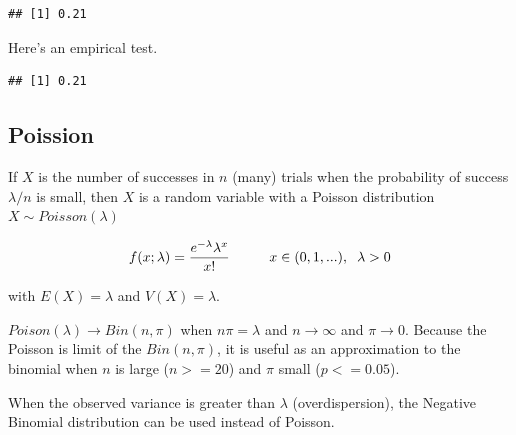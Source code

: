 \documentclass[
]{book}
\newenvironment{Shaded}{\begin{snugshade}}{\end{snugshade}}
\newcommand{\DataTypeTok}[1]{\textcolor[rgb]{0.13,0.29,0.53}{#1}}
\newcommand{\DecValTok}[1]{\textcolor[rgb]{0.00,0.00,0.81}{#1}}
\newcommand{\FloatTok}[1]{\textcolor[rgb]{0.00,0.00,0.81}{#1}}
\newcommand{\KeywordTok}[1]{\textcolor[rgb]{0.13,0.29,0.53}{\textbf{#1}}}
\newcommand{\NormalTok}[1]{#1}
\newcommand{\OperatorTok}[1]{\textcolor[rgb]{0.81,0.36,0.00}{\textbf{#1}}}
\newcommand{\StringTok}[1]{\textcolor[rgb]{0.31,0.60,0.02}{#1}}
\begin{document}
\begin{verbatim}
## [1] 0.21
\end{verbatim}

Here's an empirical test.

\begin{Shaded}
\end{Shaded}

\begin{verbatim}
## [1] 0.21
\end{verbatim}

\hypertarget{poission}{%
\subsection{Poission}\label{poission}}

If \(X\) is the number of successes in \(n\) (many) trials when the probability of success \(\lambda / n\) is small, then \(X\) is a random variable with a Poisson distribution \(X \sim Poisson(\lambda)\)

\[f(x;\lambda) = \frac{e^{-\lambda} \lambda^x}{x!} \hspace{1cm} x \in (0, 1, ...), \hspace{2mm} \lambda > 0\]

with \(E(X)=\lambda\) and \(V(X) = \lambda\).

\(Poison(\lambda) \rightarrow Bin(n, \pi)\) when \(n\pi = \lambda\) and \(n \rightarrow \infty\) and \(\pi \rightarrow 0\). Because the Poisson is limit of the \(Bin(n, \pi)\), it is useful as an approximation to the binomial when \(n\) is large (\(n>=20\)) and \(\pi\) small (\(p<=0.05\)).

When the observed variance is greater than \(\lambda\) (overdispersion), the Negative Binomial distribution can be used instead of Poisson.
\end{document}
